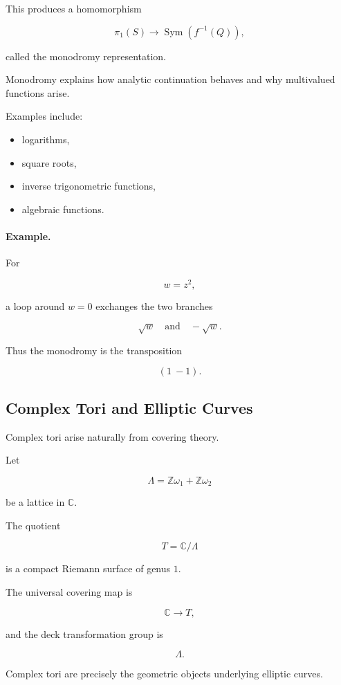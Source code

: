 \documentclass[12pt,a4paper]{article}
\theoremstyle{notespace}
\begin{document}
This produces a homomorphism

\[
\pi_1(S)
\longrightarrow
\operatorname{Sym}(f^{-1}(Q)),
\]

called the monodromy representation.

Monodromy explains how analytic continuation behaves and why multivalued functions arise.

Examples include:

\begin{itemize}
	\item logarithms,
	\item square roots,
	\item inverse trigonometric functions,
	\item algebraic functions.
\end{itemize}

\paragraph{Example.}

For

\[
w=z^2,
\]

a loop around \(w=0\) exchanges the two branches

\[
\sqrt w
\quad\text{and}\quad
-\sqrt w.
\]

Thus the monodromy is the transposition

\[
(1\ -1).
\]

\subsection{Complex Tori and Elliptic Curves}

Complex tori arise naturally from covering theory.

Let

\[
\Lambda
=
\mathbb Z\omega_1
+
\mathbb Z\omega_2
\]

be a lattice in \(\mathbb C\).

The quotient

\[
T
=
\mathbb C/\Lambda
\]

is a compact Riemann surface of genus \(1\).

The universal covering map is

\[
\mathbb C\to T,
\]

and the deck transformation group is

\[
\Lambda.
\]

Complex tori are precisely the geometric objects underlying elliptic curves.
\end{document}
